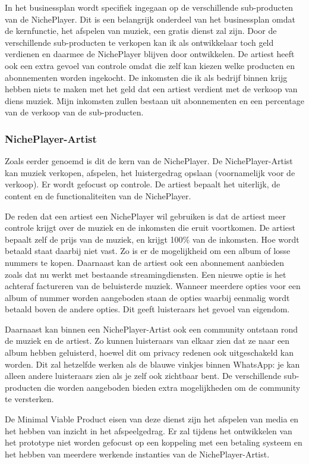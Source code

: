 In het businessplan wordt specifiek ingegaan op de verschillende sub-producten van de NichePlayer. Dit is een belangrijk onderdeel van het businessplan omdat de kernfunctie, het afspelen van muziek, een gratis dienst zal zijn. Door de verschillende sub-producten te verkopen kan ik als ontwikkelaar toch geld verdienen en daarmee de NichePlayer blijven door ontwikkelen. De artiest heeft ook een extra gevoel van controle omdat die zelf kan kiezen welke producten en abonnementen worden ingekocht. De inkomsten die ik als bedrijf binnen krijg hebben niets te maken met het geld dat een artiest verdient met de verkoop van diens muziek. Mijn inkomsten zullen bestaan uit abonnementen en een percentage van de verkoop van de sub-producten.

\subsubsection*{NichePlayer-Artist}
Zoals eerder genoemd is dit de kern van de NichePlayer. De NichePlayer-Artist kan muziek verkopen, afspelen, het luistergedrag opslaan (voornamelijk voor de verkoop). Er wordt gefocust op controle. De artiest bepaalt het uiterlijk, de content en de functionaliteiten van de NichePlayer.

De reden dat een artiest een NichePlayer wil gebruiken is dat de artiest meer controle krijgt over de muziek en de inkomsten die eruit voortkomen. De artiest bepaalt zelf de prijs van de muziek, en krijgt 100\% van de inkomsten. Hoe wordt betaald staat daarbij niet vast. Zo is er de mogelijkheid om een album of losse nummers te kopen. Daarnaast kan de artiest ook een abonnement aanbieden zoals dat nu werkt met bestaande streamingdiensten. Een nieuwe optie is het achteraf factureren van de beluisterde muziek. Wanneer meerdere opties voor een album of nummer worden aangeboden staan de opties waarbij eenmalig wordt betaald boven de andere opties. Dit geeft luisteraars het gevoel van eigendom.

Daarnaast kan binnen een NichePlayer-Artist ook een community ontstaan rond de muziek en de artiest. Zo kunnen luisteraars van elkaar zien dat ze naar een album hebben geluisterd, hoewel dit om privacy redenen ook uitgeschakeld kan worden. Dit zal hetzelfde werken als de blauwe vinkjes binnen WhatsApp: je kan alleen andere luisteraars zien als je zelf ook zichtbaar bent. De verschillende sub-producten die worden aangeboden bieden extra mogelijkheden om de community te versterken.

De Minimal Viable Product eisen van deze dienst zijn het afspelen van media en het hebben van inzicht in het afspeelgedrag. Er zal tijdens het ontwikkelen van het prototype niet worden gefocust op een koppeling met een betaling systeem en het hebben van meerdere werkende instanties van de NichePlayer-Artist.


